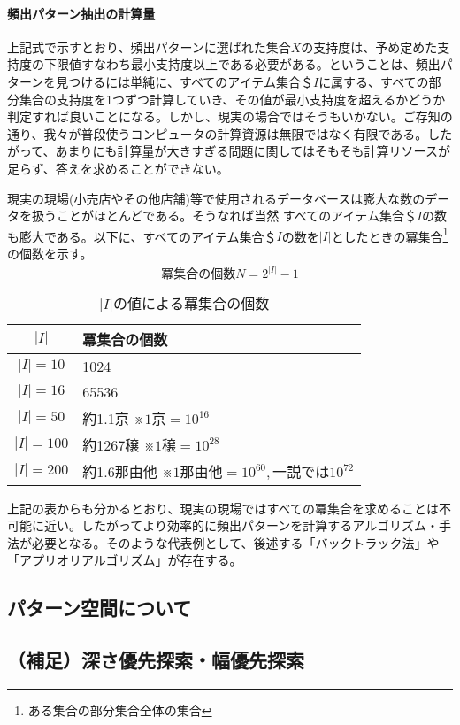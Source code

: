 \documentclass[dvipdfmx]{jsarticle}
\begin{document}
\paragraph{頻出パターン抽出の計算量}
上記式で示すとおり、頻出パターンに選ばれた集合$X$の支持度は、予め定めた支持度の下限値すなわち最小支持度以上である必要がある。ということは、頻出パターンを見つけるには単純に、すべてのアイテム集合＄$I$に属する、すべての部分集合の支持度を1つずつ計算していき、その値が最小支持度を超えるかどうか判定すれば良いことになる。しかし、現実の場合ではそうもいかない。ご存知の通り、我々が普段使うコンピュータの計算資源は無限ではなく有限である。したがって、あまりにも計算量が大きすぎる問題に関してはそもそも計算リソースが足らず、答えを求めることができない。\par
現実の現場(小売店やその他店舗)等で使用されるデータベースは膨大な数のデータを扱うことがほとんどである。そうなれば当然
すべてのアイテム集合＄$I$の数も膨大である。以下に、すべてのアイテム集合＄$I$の数を$|I|$としたときの冪集合\footnote{ある集合の部分集合全体の集合}の個数を示す。
\begin{gather*}
  冪集合の個数N = 2^{|I|}-1
\end{gather*}
\begin{table}[H]
  \begin{center}
    \caption{$|I|の値による冪集合の個数$}
    \begin{tabular}{|c|l|} \hline
      $|I|$ & 冪集合の個数 \\ \hline
      $|I| = 10$ & 1024 \\
      $|I| = 16$ & 65536 \\
      $|I| = 50$ & 約1.1京 ※$1京=10^{16}$\\
      $|I| = 100$ & 約1267穣 ※$1穣=10^{28}$\\
      $|I| = 200$ & 約1.6那由他 ※$1那由他=10^{60}, 一説では10^{72}$ \\ \hline
    \end{tabular}
    \label{hyo01}
  \end{center}
\end{table}
上記の表からも分かるとおり、現実の現場ではすべての冪集合を求めることは不可能に近い。したがってより効率的に頻出パターンを計算するアルゴリズム・手法が必要となる。そのような代表例として、後述する「バックトラック法」や「アプリオリアルゴリズム」が存在する。
\subsection{パターン空間について}
\subsection{（補足）深さ優先探索・幅優先探索}
\end{document}
